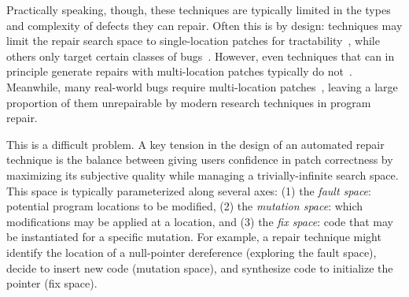 \documentclass[10pt,journal,compsoc]{IEEEtran}
\begin{document}
Practically speaking, though, these techniques are typically limited in the types and
complexity of defects they can repair. Often this is by design: techniques may
limit the repair search space to single-location patches for
tractability~\cite{rsrepair,ae,hdrepair,capgen}, while others only target certain
classes of bugs~\cite{Xuan17,sapfix,DeMarco14,par}. However, even techniques
that can in principle generate repairs with multi-location patches typically
do not~\cite{patch-correctness}.
%
Meanwhile, many real-world bugs require multi-location 
patches~\cite{d4j-dissection,zhong2015}, leaving a large
proportion of them unrepairable by modern
research techniques in program repair.  

This is a difficult problem.
A key tension in the design of an automated repair technique is the balance
between giving users confidence in patch correctness by maximizing its
subjective quality while managing a trivially-infinite search space. This space
is typically parameterized along several axes: (1) the \emph{fault space}:
potential program locations to be modified, (2) the \emph{mutation space}: which
modifications may be applied at a location, and (3) the \emph{fix space}: code
that may be instantiated for a specific mutation. For example, a repair
technique might identify the location of a null-pointer dereference (exploring
the fault space), decide to insert new code (mutation space), and synthesize
code to initialize the pointer (fix space). 
\end{document}
